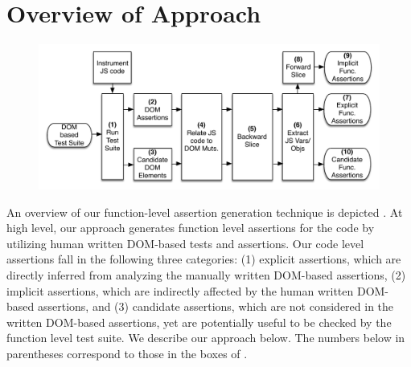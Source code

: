 \section{Overview of Approach} \label{Sec:approach}

\begin{figure}[!t]
  \centering
  \includegraphics[width=.7\hsize]{fig/approachDiagram}
  \vspace{-0.1in} 
  \label{Fig:approachDiagram}
  \vspace{-0.1in} 
\end{figure}
An overview of our \javascript function-level assertion generation technique is depicted .
At high level, our approach generates function level assertions for the \javascript code by utilizing human written DOM-based tests and assertions. Our code level assertions fall in the following three categories: (1) explicit assertions, which are directly inferred from analyzing the manually written DOM-based assertions, (2) implicit assertions, which are indirectly affected by the human written DOM-based assertions, and (3) candidate assertions, which are not considered in the written DOM-based assertions, yet are potentially useful to be checked by the function level test suite. We describe our approach below. The numbers below in parentheses correspond to those in the boxes of .

